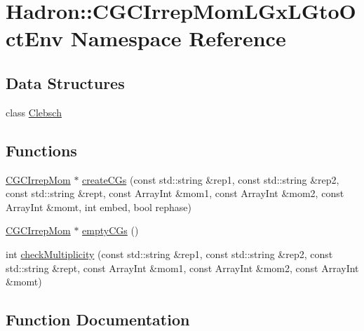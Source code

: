 \hypertarget{namespaceHadron_1_1CGC_1_1CGCIrrepMomLGxLGtoOctEnv}{}\section{Hadron\+:\+:C\+G\+C\+Irrep\+Mom\+L\+Gx\+L\+Gto\+Oct\+Env Namespace Reference}
\label{namespaceHadron_1_1CGC_1_1CGCIrrepMomLGxLGtoOctEnv}
\subsection*{Data Structures}
\begin{DoxyCompactItemize}
\item 
class \mbox{\hyperlink{classHadron_1_1CGC_1_1CGCIrrepMomLGxLGtoOctEnv_1_1Clebsch}{Clebsch}}
\end{DoxyCompactItemize}
\subsection*{Functions}
\begin{DoxyCompactItemize}
\item 
\mbox{\hyperlink{classHadron_1_1CGCIrrepMom}{C\+G\+C\+Irrep\+Mom}} $\ast$ \mbox{\hyperlink{namespaceHadron_1_1CGC_1_1CGCIrrepMomLGxLGtoOctEnv_a326be3440106df05ce61c23e713f7312}{create\+C\+Gs}} (const std\+::string \&rep1, const std\+::string \&rep2, const std\+::string \&rept, const Array\+Int \&mom1, const Array\+Int \&mom2, const Array\+Int \&momt, int embed, bool rephase)
\item 
\mbox{\hyperlink{classHadron_1_1CGCIrrepMom}{C\+G\+C\+Irrep\+Mom}} $\ast$ \mbox{\hyperlink{namespaceHadron_1_1CGC_1_1CGCIrrepMomLGxLGtoOctEnv_afd66508df18d3aba9ecfc7d3ad09e448}{empty\+C\+Gs}} ()
\item 
int \mbox{\hyperlink{namespaceHadron_1_1CGC_1_1CGCIrrepMomLGxLGtoOctEnv_aa39bf5f462bddb44a91da07a903947f4}{check\+Multiplicity}} (const std\+::string \&rep1, const std\+::string \&rep2, const std\+::string \&rept, const Array\+Int \&mom1, const Array\+Int \&mom2, const Array\+Int \&momt)
\end{DoxyCompactItemize}


\subsection{Function Documentation}
\mbox{\label{namespaceHadron_1_1CGC_1_1CGCIrrepMomLGxLGtoOctEnv_aa39bf5f462bddb44a91da07a903947f4}} 
